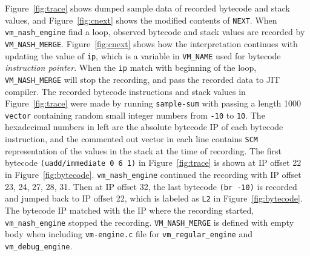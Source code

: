 \documentclass[preprint, 10pt]{sigplanconf}
\begin{document}
Figure~\hyperref[fig:trace]{\ref{fig:trace}} shows dumped sample data of
recorded bytecode and stack values, and
Figure~\hyperref[fig:cnext]{\ref{fig:cnext}} shows the modified contents of
\texttt{NEXT}. When \texttt{vm\_nash\_engine} find a loop, observed bytecode and
stack values are recorded by
\texttt{VM\_NASH\_MERGE}. Figure~\hyperref[fig:cnext]{\ref{fig:cnext}} shows how
the interpretation continues with updating the value of \texttt{ip}, which is a
variable in \texttt{VM\_NAME} used for bytecode \textit{instruction
  pointer}. When the \texttt{ip} match with beginning of the loop,
\texttt{VM\_NASH\_MERGE} will stop the recording, and pass the recorded data to
JIT compiler. The recorded bytecode instructions and stack values in
Figure~\hyperref[fig:trace]{\ref{fig:trace}} were made by running
\texttt{sample-sum} with passing a length 1000 \texttt{vector} containing random
small integer numbers from \texttt{-10} to \texttt{10}. The hexadecimal numbers
in left are the absolute bytecode IP of each bytecode instruction, and the
commented out vector in each line contains \texttt{SCM} representation of the
values in the stack at the time of recording.  The first bytecode
\texttt{(uadd/immediate 0 6 1)} in Figure~\hyperref[fig:trace]{\ref{fig:trace}}
is shown at IP offset 22 in
Figure~\hyperref[fig:bytecode]{\ref{fig:bytecode}}. \texttt{vm\_nash\_engine}
continued the recording with IP offset 23, 24, 27, 28, 31. Then at IP offset 32,
the last bytecode \texttt{(br -10)} is recorded and jumped back to IP offset 22,
which is labeled as \texttt{L2} in
Figure~\hyperref[fig:bytecode]{\ref{fig:bytecode}}. The bytecode IP matched with
the IP where the recording started, \texttt{vm\_nash\_engine} stopped the
recording. \texttt{VM\_NASH\_MERGE} is defined with empty body when including
\texttt{vm-engine.c} file for \texttt{vm\_regular\_engine} and
\texttt{vm\_debug\_engine}.

\end{document}
